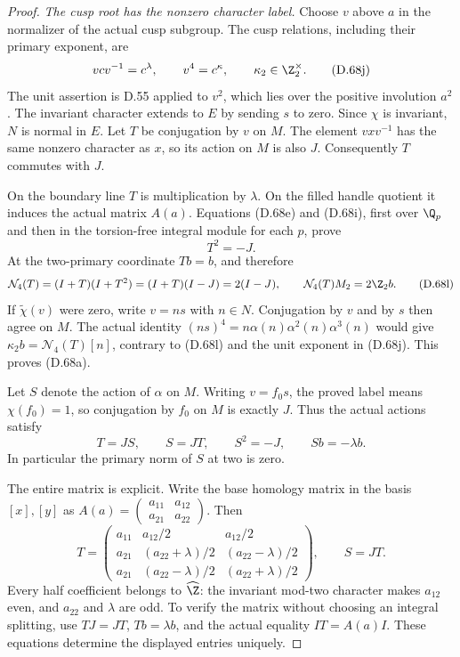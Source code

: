 \begin{proof}
\emph{The cusp root has the nonzero character label.}
Choose $v$ above $a$ in the normalizer of the actual
cusp subgroup. The cusp relations, including their
primary exponent, are
\[
 vcv^{-1}=c^\lambda,\qquad v^4=c^\kappa,\qquad
                         \kappa_2\in\Z_2^\times.          \tag{D.68j}
\]
The unit assertion is D.55 applied to $v^2$, which
lies over the positive involution $a^2$.
The invariant character extends to $E$ by sending $s$
to zero. Since $\chi$ is invariant, $N$ is normal in
$E$. Let $T$ be conjugation by $v$ on $M$.
The element $vxv^{-1}$ has the same nonzero character
as $x$, so its action on $M$ is also $J$.
Consequently $T$ commutes with $J$.

On the boundary line $T$ is multiplication by $\lambda$.
On the filled handle quotient it induces the actual
matrix $A(a)$. Equations (D.68e) and (D.68i), first
over $\Q_p$ and then in the torsion-free integral
module for each $p$, prove
\[
                   T^2=-J.                                \tag{D.68k}
\]
At the two-primary coordinate $Tb=b$, and therefore
\[
 \mathcal N_4(T)=(I+T)(I+T^2)
           =(I+T)(I-J)=2(I-J),\qquad
 \mathcal N_4(T)M_2=2\Z_2b.                               \tag{D.68l}
\]
If $\widetilde\chi(v)$ were zero, write $v=ns$ with
$n\in N$. Conjugation by $v$ and by $s$ then agree
on $M$. The actual identity
$(ns)^4=n\alpha(n)\alpha^2(n)\alpha^3(n)$ would give
$\kappa_2b=\mathcal N_4(T)[n]$, contrary to
(D.68l) and the unit exponent in (D.68j).
This proves (D.68a).

Let $S$ denote the action of $\alpha$ on $M$.
Writing $v=f_0s$, the proved label means $\chi(f_0)=1$,
so conjugation by $f_0$ on $M$ is exactly $J$.
Thus the actual actions satisfy
\[
            T=JS,\qquad S=JT,\qquad
            S^2=-J,\qquad Sb=-\lambda b.                  \tag{D.68m}
\]
In particular the primary norm of $S$ at two is zero.

The entire matrix is explicit. Write the base homology
matrix in the basis $[x],[y]$ as
$A(a)=\left(\begin{smallmatrix}a_{11}&a_{12}\\
a_{21}&a_{22}\end{smallmatrix}\right)$. Then
\[
 T=\begin{pmatrix}
 a_{11}&a_{12}/2&a_{12}/2\\
 a_{21}&(a_{22}+\lambda)/2&(a_{22}-\lambda)/2\\
 a_{21}&(a_{22}-\lambda)/2&(a_{22}+\lambda)/2
 \end{pmatrix},\qquad S=JT.                               \tag{D.68n}
\]
Every half coefficient belongs to $\widehat\Z$:
the invariant mod-two character makes $a_{12}$ even,
and $a_{22}$ and $\lambda$ are odd. To verify the
matrix without choosing an integral splitting, use
$TJ=JT$, $Tb=\lambda b$, and the actual equality
$IT=A(a)I$. These equations determine the displayed
entries uniquely.


\end{proof}
